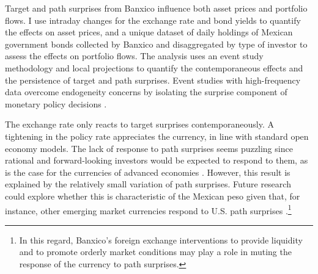 {Target and path surprises from Banxico influence both asset prices and portfolio flows. 
I use intraday changes for the exchange rate and bond yields to quantify the effects on asset prices, and 
a unique dataset of daily holdings of Mexican government bonds collected by Banxico and disaggregated by type of investor to assess the effects on portfolio flows. 
The analysis uses an event study methodology and local projections to quantify the contemporaneous effects and the persistence of target and path surprises. Event studies with high-frequency data overcome endogeneity concerns by isolating the surprise component of monetary policy decisions \parencite{NakamuraSteinsson:2018JEP}. 

The exchange rate only reacts to target surprises contemporaneously. 
A tightening in the policy rate appreciates the currency, in line with standard open economy models. 
The lack of response to path surprises seems puzzling since rational and forward-looking investors would be expected to respond to them, as is the case for the currencies of advanced economies \parencite{Rosa:2011JBF, FerrariKearnsSchrimpf:2021}. 
However, this result is explained by the relatively small variation of path surprises. 
Future research could explore whether this is characteristic of the Mexican peso given that, for instance, other emerging market currencies respond to U.S. path surprises \parencite{HausmanWongswan:2011}.\footnote{In this regard, Banxico's foreign exchange interventions to provide liquidity and to promote orderly market conditions may play a role in muting the response of the currency to path surprises.} 

}

